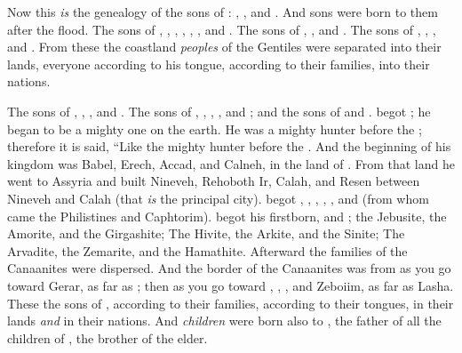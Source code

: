 
\bverse Now this \textit{is} the genealogy of the sons of : , , and . And sons were born to them after the flood.
\bverse The sons of  \were {}, , , , , , and .
\bverse The sons of  \were {}, , and .
\bverse The sons of  \were {}, , , and .
\bverse From these the coastland \textit{peoples} of the Gentiles were separated into their lands, everyone according to his tongue, according to their families, into their nations.

\bverse The sons of  \were {}, , , and .
\bverse The sons of  \were {}, , , , and ; and the sons of  \were {} and .
\bverse {} begot ; he began to be a mighty one on the earth.
\bverse He was a mighty hunter before the \lord; therefore it is said, ``Like  the mighty hunter before the \lord.
\bverse And the beginning of his kingdom was Babel, Erech, Accad, and Calneh, in the land of .
\bverse From that land he went to Assyria and built Nineveh, Rehoboth Ir, Calah,
\bverse and Resen between Nineveh and Calah (that \textit{is} the principal city).
\bverse {} begot , , , ,
\bverse {}, and  (from whom came the Philistines and Caphtorim).
\bverse {} begot  his firstborn, and ;
\bverse the Jebusite, the Amorite, and the Girgashite;
\bverse The Hivite, the Arkite, and the Sinite;
\bverse The Arvadite, the Zemarite, and the Hamathite. Afterward the families of the Canaanites were dispersed.
\bverse And the border of the Canaanites was from  as you go toward Gerar, as far as ; then as you go toward , , , and Zeboiim, as far as Lasha.
\bverse These \were the sons of , according to their families, according to their tongues, in their lands \textit{and} in their nations.
\bverse And \textit{children} were born also to , the father of all the children of , the brother of  the elder.

